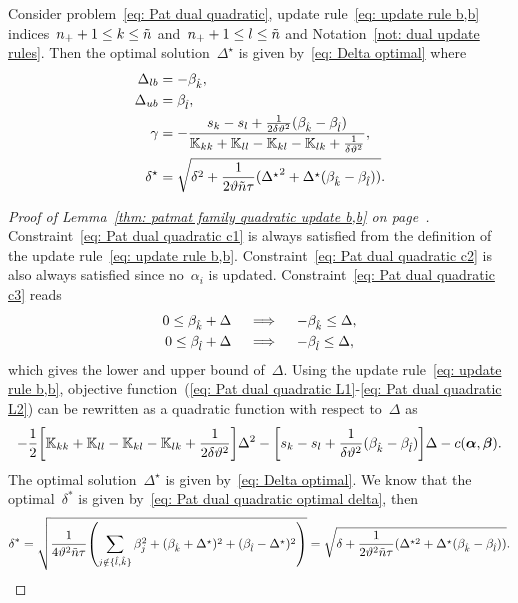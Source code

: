 \begin{lemma}\label{thm: patmat family quadratic update b,b}
  Consider problem~\eqref{eq: Pat dual quadratic}, update rule~\eqref{eq: update rule b,b} indices~$n_{+} + 1 \leq k \leq \tilde{n}$ and~$n_{+} + 1 \leq l \leq \tilde{n}$ and Notation~\ref{not: dual update rules}. Then the optimal solution~$\Delta^{\star}$ is given by~\eqref{eq: Delta optimal} where
  \begin{align*}
    \Delta_{lb} & = - \beta_{\hat{k}}, \\
    \Delta_{ub} & = \beta_{\hat{l}}, \\
    \gamma      & = -\frac{s_k - s_l + \frac{1}{2\delta \vartheta^2}(\beta_{\hat{k}} - \beta_{\hat{l}})}{\mathbb{K}_{kk} + \mathbb{K}_{ll} - \mathbb{K}_{kl} - \mathbb{K}_{lk} + \frac{1}{\delta \vartheta^2}}, \\
    \delta^{\star}  & = \sqrt{\delta^2 + \frac{1}{2 \vartheta \tilde{n} \tau}({\Delta^{\star}}^2 + \Delta^{\star} (\beta_{\hat{k}} - \beta_{\hat{l}}))}.
  \end{align*}
\end{lemma}

\begin{proof}[Proof of Lemma~\ref{thm: patmat family quadratic update b,b} on page~\pageref{thm: patmat family quadratic update b,b}]
  Constraint~\eqref{eq: Pat dual quadratic c1} is always satisfied from the definition of the update rule~\eqref{eq: update rule b,b}. Constraint~\eqref{eq: Pat dual quadratic c2} is also always satisfied since no~$\alpha_i$ is updated. Constraint~\eqref{eq: Pat dual quadratic c3} reads
  \begin{align*}
    0 \leq \beta_{\hat{k}} + \Delta
    & \quad \implies \quad
    - \beta_{\hat{k}} \leq \Delta, \\
    0 \leq \beta_{\hat{l}} + \Delta
    & \quad \implies \quad
    - \beta_{\hat{l}} \leq \Delta, \\
  \end{align*}
  which gives the lower and upper bound of~$\Delta.$ Using the update rule~\eqref{eq: update rule b,b}, objective function~(\ref{eq: Pat dual quadratic L1}-\ref{eq: Pat dual quadratic L2}) can be rewritten as a quadratic function with respect to~$\Delta$ as
  \begin{equation*}
    - \frac{1}{2} \Brac[s]{\K_{kk} + \K_{ll} - \K_{kl} - \K_{lk} + \frac{1}{2\delta\vartheta^2}} \Delta^2
    - \Brac[s]{s_k - s_l + \frac{1}{\delta\vartheta^2}(\betak - \betal)} \Delta
    - c(\bm{\alpha}, \bm{\beta}).
  \end{equation*}
  The optimal solution~$\Delta^{\star}$ is given by~\eqref{eq: Delta optimal}.   We know that the optimal~$\delta^*$ is given by~\eqref{eq: Pat dual quadratic optimal delta}, then
  \begin{equation*}
    \delta^*
      = \sqrt{\frac{1}{4\vartheta^2 \ntil \tau} \Brac{\sum_{j \notin \{\hat{l}, \hat{k}\}} \beta_j^2 + (\betak + \Delta^\star)^2 + (\betal - \Delta^\star)^2}} 
      = \sqrt{\delta + \frac{1}{2\vartheta^2 \ntil \tau} (\Delta^{\star2} + \Delta^\star (\betak - \betal))}.
  \end{equation*}
\end{proof}

